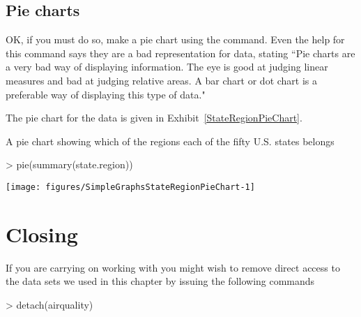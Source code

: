 \subsection{Pie charts} 
 
OK, if you must do so, make a pie chart using the  command. Even the help for this command says they are a bad representation for data, stating ``Pie charts are a very bad way of displaying information. The eye is good at judging linear measures and bad at judging relative areas. A bar chart or dot chart is a preferable way of displaying this type of data."  
 
The pie chart for the  data is given in Exhibit~\ref{StateRegionPieChart}. 
\begin{exhibit} 
\begin{center} 
\caption{A pie chart showing which of the regions each of the fifty U.S. states belongs} 
\label{StateRegionPieChart} 
\begin{Schunk}
\begin{Sinput}
> pie(summary(state.region)) 
\end{Sinput}

\texttt{[image: figures/SimpleGraphsStateRegionPieChart-1]} \end{Schunk}
\end{center} 
\end{exhibit} 
 
 
\section{Closing} 
 
If you are carrying on working with \R{} you might wish to remove direct access to the data sets we used in this chapter by issuing the following commands 
\begin{Schunk}
\begin{Sinput}
> detach(airquality) 
\end{Sinput}
\end{Schunk}


